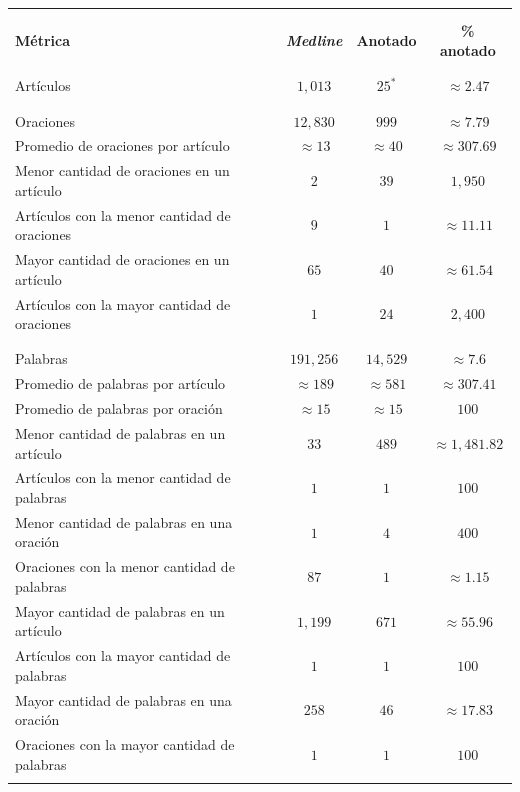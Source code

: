 \begin{table}[H]
	\begin{center}
		\begin{tabular}{lccc}
			\noalign{\hrule height 1pt}\\
			\vspace{-0.35in}\\
			\textbf{Métrica} & \textbf{\textit{Medline}} & \textbf{Anotado} & \textbf{\% anotado}\\
			\hline\\
			\vspace{-0.35in}\\
			Artículos & $1,013$ & $25^*$ & $\approx2.47$\\
			\hline\\
			\vspace{-0.35in}\\
			Oraciones & $12,830$ & $999$ & $\approx7.79$\\
			Promedio de oraciones por artículo & $\approx13$ & $\approx40$ & $\approx307.69$\\
			Menor cantidad de oraciones en un artículo & $2$ & $39$ & $1,950$\\
			Artículos con la menor cantidad de oraciones & $9$ & $1$ & $\approx11.11$\\
			Mayor cantidad de oraciones en un artículo & $65$ & $40$ & $\approx61.54$\\
			Artículos con la mayor cantidad de oraciones & $1$ & $24$ & $2,400$\\
			\hline\\
			\vspace{-0.35in}\\
			Palabras & $191,256$ & $14,529$ & $\approx7.6$\\
			Promedio de palabras por artículo & $\approx189$ & $\approx581$ & $\approx307.41$\\
			Promedio de palabras por oración & $\approx15$ & $\approx15$ & $100$\\
			Menor cantidad de palabras en un artículo & $33$ & $489$ & $\approx1,481.82$\\
			Artículos con la menor cantidad de palabras & $1$ & $1$ & $100$\\
			Menor cantidad de palabras en una oración & $1$ & $4$ & $400$\\
			Oraciones con la menor cantidad de palabras & $87$ & $1$ & $\approx1.15$\\
			Mayor cantidad de palabras en un artículo & $1,199$ & $671$ & $\approx55.96$\\
			Artículos con la mayor cantidad de palabras & $1$ & $1$ & $100$\\
			Mayor cantidad de palabras en una oración & $258$ & $46$ & $\approx17.83$\\
			Oraciones con la mayor cantidad de palabras & $1$ & $1$ & $100$\\
			\noalign{\hrule height 1pt}\\
		\end{tabular}


\end{center}
\end{table}
